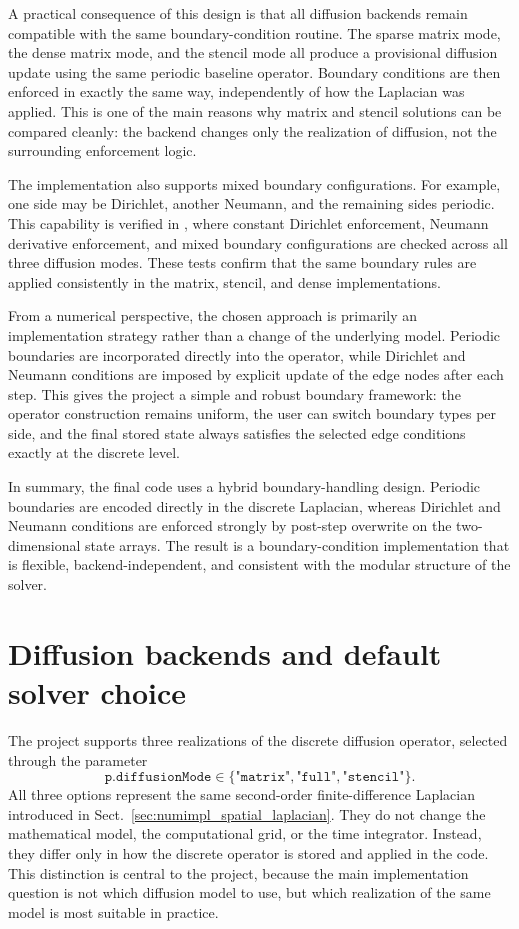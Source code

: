 A practical consequence of this design is that all diffusion backends remain compatible with the same boundary-condition routine. The sparse matrix mode, the dense matrix mode, and the stencil mode all produce a provisional diffusion update using the same periodic baseline operator. Boundary conditions are then enforced in exactly the same way, independently of how the Laplacian was applied. This is one of the main reasons why matrix and stencil solutions can be compared cleanly: the backend changes only the realization of diffusion, not the surrounding enforcement logic.

The implementation also supports mixed boundary configurations. For example, one side may be Dirichlet, another Neumann, and the remaining sides periodic. This capability is verified in , where constant Dirichlet enforcement, Neumann derivative enforcement, and mixed boundary configurations are checked across all three diffusion modes. These tests confirm that the same boundary rules are applied consistently in the matrix, stencil, and dense implementations.

From a numerical perspective, the chosen approach is primarily an implementation strategy rather than a change of the underlying model. Periodic boundaries are incorporated directly into the operator, while Dirichlet and Neumann conditions are imposed by explicit update of the edge nodes after each step. This gives the project a simple and robust boundary framework: the operator construction remains uniform, the user can switch boundary types per side, and the final stored state always satisfies the selected edge conditions exactly at the discrete level.

In summary, the final code uses a hybrid boundary-handling design. Periodic boundaries are encoded directly in the discrete Laplacian, whereas Dirichlet and Neumann conditions are enforced strongly by post-step overwrite on the two-dimensional state arrays. The result is a boundary-condition implementation that is flexible, backend-independent, and consistent with the modular structure of the solver.

\section{Diffusion backends and default solver choice}
\label{sec:numimpl_backends_selection}

The project supports three realizations of the discrete diffusion operator, selected through the parameter
\[
\texttt{p.diffusionMode} \in \{\texttt{"matrix"},\texttt{"full"},\texttt{"stencil"}\}.
\]
All three options represent the same second-order finite-difference Laplacian introduced in Sect.~\ref{sec:numimpl_spatial_laplacian}. They do not change the mathematical model, the computational grid, or the time integrator. Instead, they differ only in how the discrete operator is stored and applied in the code. This distinction is central to the project, because the main implementation question is not which diffusion model to use, but which realization of the same model is most suitable in practice.

